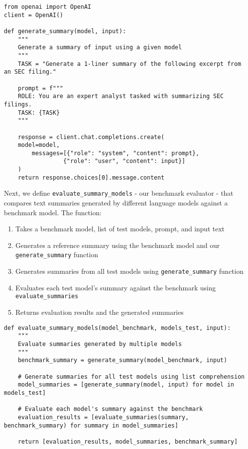 \begin{verbatim}
from openai import OpenAI
client = OpenAI()

def generate_summary(model, input):
    """
    Generate a summary of input using a given model
    """
    TASK = "Generate a 1-liner summary of the following excerpt from an SEC filing."

    prompt = f"""
    ROLE: You are an expert analyst tasked with summarizing SEC filings.
    TASK: {TASK}
    """
    
    response = client.chat.completions.create(
    model=model,
        messages=[{"role": "system", "content": prompt},
                 {"role": "user", "content": input}]
    )
    return response.choices[0].message.content
\end{verbatim}
Next, we define \texttt{evaluate\_summary\_models} - our benchmark evaluator - that compares text summaries generated by different language models against a benchmark model. The function:

\begin{enumerate}
    \item Takes a benchmark model, list of test models, prompt, and input text
    \item Generates a reference summary using the benchmark model and our \texttt{generate\_summary} function
    \item Generates summaries from all test models using \texttt{generate\_summary} function
    \item Evaluates each test model's summary against the benchmark using \texttt{evaluate\_summaries}
    \item Returns evaluation results and the generated summaries
\end{enumerate}

\begin{verbatim}
def evaluate_summary_models(model_benchmark, models_test, input):
    """
    Evaluate summaries generated by multiple models
    """
    benchmark_summary = generate_summary(model_benchmark, input)

    # Generate summaries for all test models using list comprehension
    model_summaries = [generate_summary(model, input) for model in models_test]
    
    # Evaluate each model's summary against the benchmark
    evaluation_results = [evaluate_summaries(summary, benchmark_summary) for summary in model_summaries]

    return [evaluation_results, model_summaries, benchmark_summary]
\end{verbatim}

